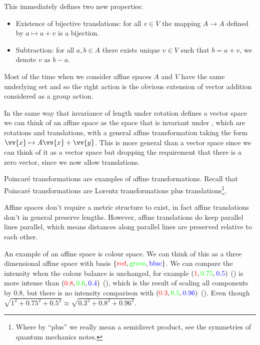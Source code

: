 \documentclass[fleqn]{NotesClass}
\begin{document}
    This immediately defines two new properties:
    \begin{itemize}[resume]
        \item Existence of bijective translations: for all \(v \in V\) the mapping \(A \to A\) defined by \(a \mapsto a + v\) is a bijection.
        \item Subtraction: for all \(a, b \in A\) there exists unique \(v \in V\) such that \(b = a + v\), we denote \(v\) as \(b - a\).
    \end{itemize}
    
    Most of the time when we consider affine spaces \(A\) and \(V\) have the same underlying set and so the right action is the obvious extension of vector addition considered as a group action.
    
    In the same way that invariance of length under rotation defines a vector space we can think of an affine space as the space that is invariant under , which are rotations and translations, with a general affine transformation taking the form \(\vv{x} \mapsto A\vv{x} + \vv{y}\).
    This is more general than a vector space since we can think of it as a vector space but dropping the requirement that there is a zero vector, since we now allow translations.
    
    Poincar\'e transformations are examples of affine transformations.
    Recall that Poincar\'e transformations are Lorentz transformations plus translations\footnote{Where by \enquote{plus} we really mean a semidirect product, see the symmetries of quantum mechanics notes.}.
    
    Affine spaces don't require a metric structure to exist, in fact affine translations don't in general preserve lengths.
    However, affine translations do keep parallel lines parallel, which means distances along parallel lines are preserved relative to each other.
    
    \tikzexternaldisable
    An example of an affine space is colour space.
    We can think of this as a three dimensional affine space with basis \(\{\textcolor{red}{\text{red}}, \textcolor{green}{\text{green}}, \textcolor{blue}{\text{blue}}\}\).
    We can compare the intensity when the colour balance is unchanged, for example \((\textcolor{red}{1}, \textcolor{green}{0.75}, \textcolor{blue}{0.5})\) () is more intense than \((\textcolor{red}{0.8}, \textcolor{green}{0.6}, \textcolor{blue}{0.4})\) (), which is the result of scaling all components by \(0.8\), but there is no intensity comparison with \((\textcolor{red}{0.3}, \textcolor{green}{0.5}, \textcolor{blue}{0.96})\) ().
    Even though \(\sqrt{1^2 + 0.75^2 + 0.5^2} \approx \sqrt{0.3^2 + 0.8^2 + 0.96^2}\).
    \tikzexternalenable
    
\end{document}
